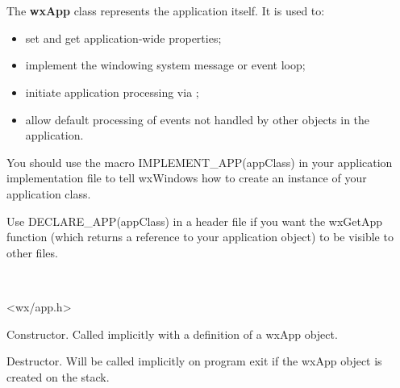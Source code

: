 \section{}\label{wxapp}

The {\bf wxApp} class represents the application itself. It is used
to:

\begin{itemize}\itemsep=0pt
\item set and get application-wide properties;
\item implement the windowing system message or event loop;
\item initiate application processing via ;
\item allow default processing of events not handled by other
objects in the application.
\end{itemize}

You should use the macro IMPLEMENT\_APP(appClass) in your application implementation
file to tell wxWindows how to create an instance of your application class.

Use DECLARE\_APP(appClass) in a header file if you want the wxGetApp function (which returns
a reference to your application object) to be visible to other files.


\\


<wx/app.h>







Constructor. Called implicitly with a definition of a wxApp object.




Destructor. Will be called implicitly on program exit if the wxApp
object is created on the stack.


\label{wxappargc}


